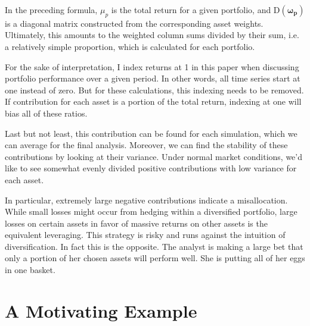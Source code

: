 \documentclass[a4paper]{article}\usepackage[]{graphicx}\usepackage[]{color}
\begin{document}
In the preceding formula, $\mu_p$ is the total return for a given portfolio, and $\mathrm{D}(\bm{\omega_p})$ is a diagonal matrix constructed from the corresponding asset weights. Ultimately, this amounts to the weighted column sums divided by their sum, i.e. a relatively simple proportion, which is calculated for each portfolio.

For the sake of interpretation, I index returns at 1 in this paper when discussing portfolio performance over a given period. In other words, all time series start at one instead of zero. But for these calculations, this indexing needs to be removed. If contribution for each asset is a portion of the total return, indexing at one will bias all of these ratios.

Last but not least, this contribution can be found for each simulation, which we can average for the final analysis. Moreover, we can find the stability of these contributions by looking at their variance. Under normal market conditions, we'd like to see somewhat evenly divided positive contributions with low variance for each asset. 

In particular, extremely large negative contributions indicate a misallocation. While small losses might occur from hedging within a diversified portfolio, large losses on certain assets in favor of massive returns on other assets is the equivalent leveraging. This strategy is risky and runs against the intuition of diversification. In fact this is the opposite. The analyst is making a large bet that only a portion of her chosen assets will perform well. She is putting all of her eggs in one basket.

\section{A Motivating Example}
\end{document}
